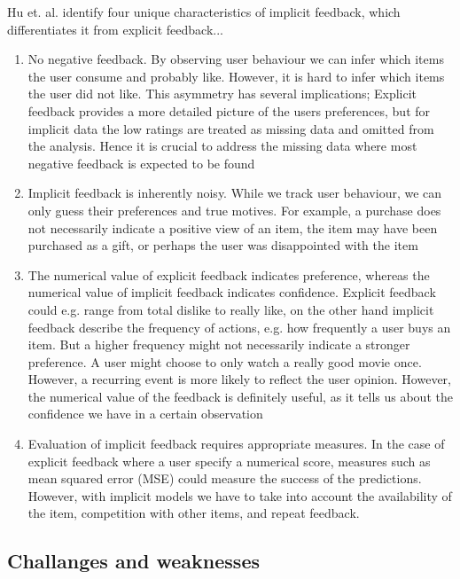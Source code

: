 Hu et. al. \cite{Hu2008} identify four unique characteristics of implicit
feedback, which differentiates it from explicit feedback...

\begin{enumerate}

\item No negative feedback. By observing user behaviour we can infer which
items the user consume and probably like. However, it is hard to infer which
items the user did not like. This asymmetry has several implications; Explicit
feedback provides a more detailed picture of the
users preferences, but for implicit data the low ratings are treated as missing
data and omitted from the analysis. Hence it is crucial to address the missing
data where most negative feedback is expected to be found

\item Implicit feedback is inherently noisy. While we track user behaviour, we
can only guess their preferences and true motives. For example, a purchase does
not necessarily indicate a positive view of an item, the item may have been
purchased as a gift, or perhaps the user was disappointed
with the item

\item The numerical value of explicit feedback indicates preference, whereas
the numerical value of implicit feedback indicates confidence. Explicit
feedback could e.g. range from total dislike to really like, on the other hand
implicit feedback describe the frequency of actions, e.g. how
frequently a user buys an item. But a higher frequency might not necessarily
indicate a stronger preference. A user might choose to only watch a really good
movie once. However, a recurring event is more likely to reflect the user
opinion. However, the numerical value of the feedback is definitely useful, as
it tells us about the confidence we have in a certain observation

\item Evaluation of implicit feedback requires appropriate measures. In the
case of explicit feedback where a user specify a numerical score, measures such
as mean squared error (MSE) could measure the success of the predictions.
However, with implicit models we have to take into account
the availability of the item, competition with other items, and repeat
feedback.

\end{enumerate}

\subsection{Challanges and weaknesses}

